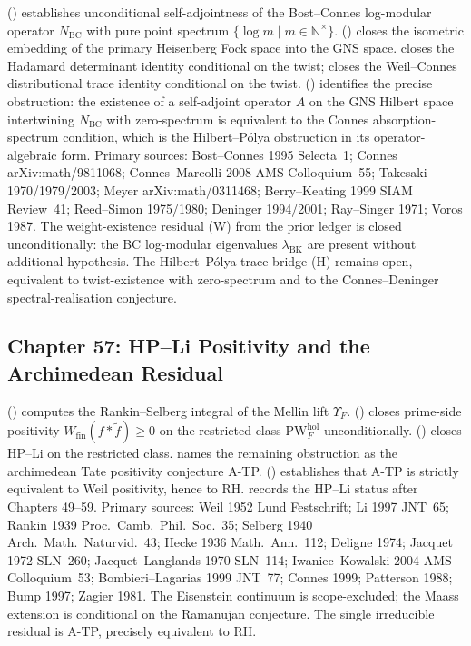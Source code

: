  (\ClaimStatusProvedHere)
establishes unconditional self-adjointness of the Bost--Connes
log-modular operator \(N_{\mathrm{BC}}\) with pure point spectrum
\(\{\log m \mid m \in \mathbb{N}^{\times}\}\).
 (\ClaimStatusProvedHere)
closes the isometric embedding of the primary Heisenberg Fock space
into the GNS space.
 closes the Hadamard determinant
identity conditional on the twist;
 closes the Weil--Connes
distributional trace identity conditional on the twist.
 (\ClaimStatusProvedHere)
identifies the precise obstruction: the existence of a self-adjoint
operator \(A\) on the GNS Hilbert space intertwining \(N_{\mathrm{BC}}\)
with zero-spectrum is equivalent to the Connes absorption-spectrum
condition, which is the Hilbert--P\'{o}lya obstruction in its
operator-algebraic form.
Primary sources: Bost--Connes 1995 Selecta~1;
Connes arXiv:math/9811068; Connes--Marcolli 2008 AMS Colloquium~55;
Takesaki 1970/1979/2003; Meyer arXiv:math/0311468;
Berry--Keating 1999 SIAM Review~41; Reed--Simon 1975/1980;
Deninger 1994/2001; Ray--Singer 1971; Voros 1987.
The weight-existence residual (W) from the prior ledger is closed
unconditionally: the BC log-modular eigenvalues \(\lambda_{\mathrm{BK}}\)
are present without additional hypothesis.
The Hilbert--P\'{o}lya trace bridge (H) remains open, equivalent to
twist-existence with zero-spectrum and to the Connes--Deninger
spectral-realisation conjecture.

\subsection{Chapter 57: HP--Li Positivity and the Archimedean Residual}
\label{v4-arith:w5-synth:ch57}

 (\ClaimStatusProvedHere)
computes the Rankin--Selberg integral of the Mellin lift
\(\Upsilon_{F}\).
 (\ClaimStatusProvedHere) closes
prime-side positivity
\(W_{\mathrm{fin}}(f*\widetilde{f})\geq 0\) on the restricted class
\(\mathrm{PW}^{\mathrm{hol}}_{F}\) unconditionally.
 (\ClaimStatusProvedHere)
closes HP--Li on the restricted class.
 names the
remaining obstruction as the archimedean Tate positivity conjecture
A-TP.
 (\ClaimStatusProvedHere)
establishes that A-TP is strictly equivalent to Weil positivity, hence
to RH.
 records the HP--Li status
after Chapters 49--59.
Primary sources: Weil 1952 Lund Festschrift; Li 1997 JNT~65;
Rankin 1939 Proc.~Camb.~Phil.~Soc.~35;
Selberg 1940 Arch.~Math.~Naturvid.~43; Hecke 1936 Math.~Ann.~112;
Deligne 1974; Jacquet 1972 SLN~260; Jacquet--Langlands 1970 SLN~114;
Iwaniec--Kowalski 2004 AMS Colloquium~53; Bombieri--Lagarias 1999
JNT~77; Connes 1999; Patterson 1988; Bump 1997; Zagier 1981.
The Eisenstein continuum is scope-excluded; the Maass extension is
conditional on the Ramanujan conjecture. The single irreducible
residual is A-TP, precisely equivalent to RH.

